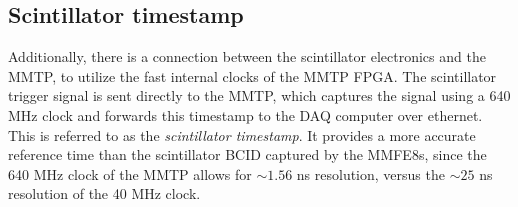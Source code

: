 \subsection{Scintillator timestamp}
\label{sec:exp-scitime}

Additionally, there is a connection between the scintillator electronics and the MMTP, to utilize the fast internal clocks of the MMTP FPGA. The scintillator trigger signal is sent directly to the MMTP, which captures the signal using a 640 MHz clock and forwards this timestamp to the DAQ computer over ethernet. This is referred to as the \textit{scintillator timestamp}. It provides a more accurate reference time than the scintillator BCID captured by the MMFE8s, since the 640 MHz clock of the MMTP allows for $\sim\!1.56$ ns resolution, versus the $\sim\!25$ ns resolution of the 40 MHz clock.

